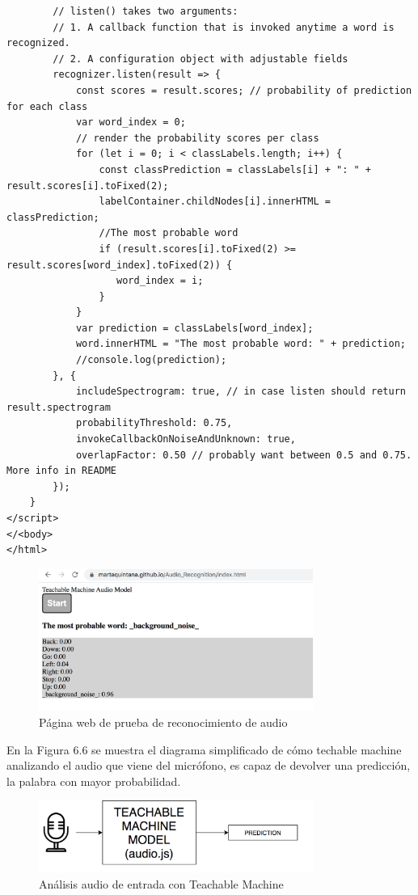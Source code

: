 \begin{lstlisting}
        // listen() takes two arguments:
        // 1. A callback function that is invoked anytime a word is recognized.
        // 2. A configuration object with adjustable fields
        recognizer.listen(result => {
            const scores = result.scores; // probability of prediction for each class
            var word_index = 0;
            // render the probability scores per class
            for (let i = 0; i < classLabels.length; i++) {
                const classPrediction = classLabels[i] + ": " + result.scores[i].toFixed(2);
                labelContainer.childNodes[i].innerHTML = classPrediction;
                //The most probable word
                if (result.scores[i].toFixed(2) >= result.scores[word_index].toFixed(2)) {
                   word_index = i;
                }
            }
            var prediction = classLabels[word_index];
            word.innerHTML = "The most probable word: " + prediction;
            //console.log(prediction);
        }, {
            includeSpectrogram: true, // in case listen should return result.spectrogram
            probabilityThreshold: 0.75,
            invokeCallbackOnNoiseAndUnknown: true,
            overlapFactor: 0.50 // probably want between 0.5 and 0.75. More info in README
        });
    }
</script>
</<body>
</html>
\end{lstlisting}

\begin{figure}[H]
    \centering
    \includegraphics[width=0.8\textwidth, height=0.4\textwidth]{chapters/images/audioprueba.png}
    \caption{Página web de prueba de reconocimiento de audio}
    \label{fig:my_label}
\end{figure}

En la Figura 6.6 se muestra el diagrama simplificado de cómo techable machine analizando el audio que viene del micrófono,  es capaz de devolver una predicción, la palabra con mayor probabilidad.
\begin{figure}[H]
    \centering
    \includegraphics[width=0.8\textwidth, height=0.2\textwidth]{chapters/images/diagrama2.png}
    \caption{Análisis audio de entrada con Teachable Machine}
    \label{fig:my_label}
\end{figure}

